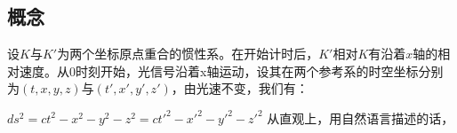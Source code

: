 \subsection{概念}
设$K$与$K'$为两个坐标原点重合的惯性系。在开始计时后，$K'$相对$K$有沿着$x$轴的相对速度。从$0$时刻开始，光信号沿着x轴运动，设其在两个参考系的时空坐标分别为$(t,x,y,z)$与$(t',x',y',z')$，由光速不变，我们有：

$ds^2=ct^2-x^2-y^2-z^2=ct'^2-x'^2-y'^2-z'^2$
从直观上，用自然语言描述的话，
